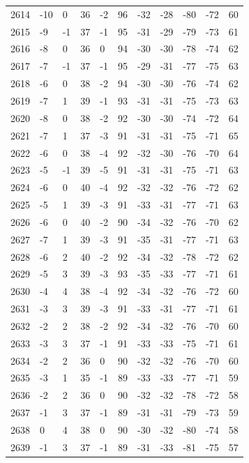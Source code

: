 \begin{table}[H]
\begin{tabular}{lllllllllll}
2614 & -10 & 0 & 36 & -2 & 96 & -32 & -28 & -80 & -72 & 60 \\
2615 & -9 & -1 & 37 & -1 & 95 & -31 & -29 & -79 & -73 & 61 \\
2616 & -8 & 0 & 36 & 0 & 94 & -30 & -30 & -78 & -74 & 62 \\
2617 & -7 & -1 & 37 & -1 & 95 & -29 & -31 & -77 & -75 & 63 \\
2618 & -6 & 0 & 38 & -2 & 94 & -30 & -30 & -76 & -74 & 62 \\
2619 & -7 & 1 & 39 & -1 & 93 & -31 & -31 & -75 & -73 & 63 \\
2620 & -8 & 0 & 38 & -2 & 92 & -30 & -30 & -74 & -72 & 64 \\
2621 & -7 & 1 & 37 & -3 & 91 & -31 & -31 & -75 & -71 & 65 \\
2622 & -6 & 0 & 38 & -4 & 92 & -32 & -30 & -76 & -70 & 64 \\
2623 & -5 & -1 & 39 & -5 & 91 & -31 & -31 & -75 & -71 & 63 \\
2624 & -6 & 0 & 40 & -4 & 92 & -32 & -32 & -76 & -72 & 62 \\
2625 & -5 & 1 & 39 & -3 & 91 & -33 & -31 & -77 & -71 & 63 \\
2626 & -6 & 0 & 40 & -2 & 90 & -34 & -32 & -76 & -70 & 62 \\
2627 & -7 & 1 & 39 & -3 & 91 & -35 & -31 & -77 & -71 & 63 \\
2628 & -6 & 2 & 40 & -2 & 92 & -34 & -32 & -78 & -72 & 62 \\
2629 & -5 & 3 & 39 & -3 & 93 & -35 & -33 & -77 & -71 & 61 \\
2630 & -4 & 4 & 38 & -4 & 92 & -34 & -32 & -76 & -72 & 60 \\
2631 & -3 & 3 & 39 & -3 & 91 & -33 & -31 & -77 & -71 & 61 \\
2632 & -2 & 2 & 38 & -2 & 92 & -34 & -32 & -76 & -70 & 60 \\
2633 & -3 & 3 & 37 & -1 & 91 & -33 & -33 & -75 & -71 & 61 \\
2634 & -2 & 2 & 36 & 0 & 90 & -32 & -32 & -76 & -70 & 60 \\
2635 & -3 & 1 & 35 & -1 & 89 & -33 & -33 & -77 & -71 & 59 \\
2636 & -2 & 2 & 36 & 0 & 90 & -32 & -32 & -78 & -72 & 58 \\
2637 & -1 & 3 & 37 & -1 & 89 & -31 & -31 & -79 & -73 & 59 \\
2638 & 0 & 4 & 38 & 0 & 90 & -30 & -32 & -80 & -74 & 58 \\
2639 & -1 & 3 & 37 & -1 & 89 & -31 & -33 & -81 & -75 & 57 \\

\end{tabular}
\end{table}
